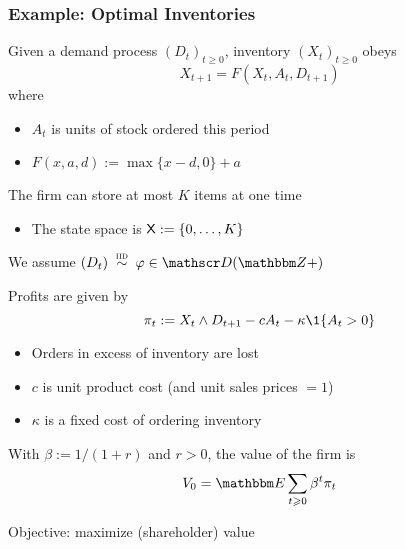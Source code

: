 \begin{frame}
    \frametitle{Example: Optimal Inventories}

    Given a demand process $(D_t)_{t \geq 0}$, inventory $(X_t)_{t \geq 0}$
    obeys
    \begin{equation*}
        X_{t+1} = F(X_t, A_t, D_{t+1}) 
    \end{equation*}
    where

    \begin{itemize}
        \item $A_t$ is units of stock ordered this period 
        \vspace{0.5em}
        \item $F(x, a, d) := \max\{x - d, 0\} + a$
    \end{itemize}

    \vspace{0.5em}
    The firm can store at most $K$ items at one time

    \vspace{0.5em}
    \begin{itemize}
        \item The state space is $\mathsf X := \{0, \ldots, K\}$
    \end{itemize}

    \vspace{0.5em}
    We assume $(D_t) \iidsim \phi \in \dD(\ZZ+)$  

\end{frame}

\begin{frame}
    
    Profits are given by
    \begin{equation*}
        \pi_t := X_t \wedge D_{t+1} - c A_t - \kappa \1\{A_t > 0\}
    \end{equation*}

    \begin{itemize}
        \item Orders in excess of
            inventory are lost 
    \vspace{0.5em}
        \item $c$ is unit product cost (and unit sales prices $=1$)
    \vspace{0.5em}
        \item $\kappa$ is a fixed cost of ordering inventory
    \end{itemize}

    \vspace{0.5em}
    \vspace{0.5em}

    With $\beta := 1/(1+r)$ and $r > 0$, the value of the firm is 
    \begin{equation*}
        V_0 = \EE \sum_{t \geq 0} \beta^t \pi_t
    \end{equation*}

    \vspace{0.5em}
    \vspace{0.5em}
    Objective: maximize (shareholder) value

\end{frame}


